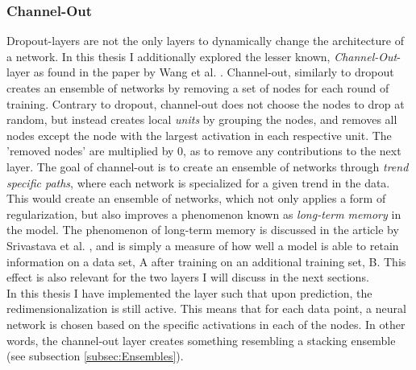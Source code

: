 \subsubsection*{Channel-Out}\label{subsubsec:Channel-Out}
Dropout-layers are not the only layers to dynamically change the architecture of a network. In this thesis I additionally 
explored the lesser known, \emph{Channel-Out}-layer as found in the paper by Wang et al. \cite{wang_maxout_2013}. 
Channel-out, similarly to dropout creates an ensemble of networks by removing a set 
of nodes for each round of training. Contrary to dropout, channel-out does not choose the nodes to drop at random,
but instead creates local \emph{units} by grouping the nodes, and removes all nodes except the node with the largest
activation in each respective unit. The 'removed nodes' are multiplied by 0, as to remove any contributions to the next layer.
The goal of channel-out is to create an ensemble of networks through \emph{trend specific paths},
where each network is specialized for a given trend in the data. This would create an ensemble of networks, which not only applies a form of 
regularization, but also improves a phenomenon known as \emph{long-term memory} in the model. The phenomenon of long-term memory is discussed in 
the article by Srivastava et al. \cite{srivastava_compete_2013}, and is simply a measure of how well a model is able to retain information on a data set, A after 
training on an additional training set, B. This effect is also relevant for the two layers I will discuss in the next sections.
\\
In this thesis I have implemented the layer such that upon prediction, the redimensionalization 
is still active. This means that for each data point, a neural network is chosen based on the specific activations in 
each of the nodes. In other words, the channel-out layer creates something resembling a stacking ensemble (see subsection 
\ref{subsec:Ensembles}). 
